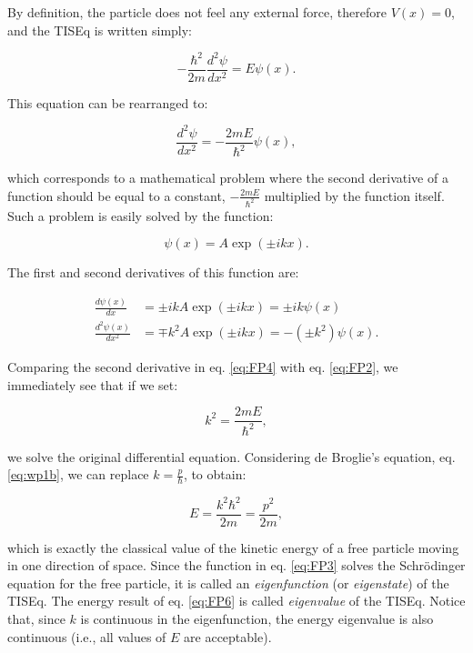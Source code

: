 \documentclass[
  9pt,
]{extbook}
\theoremstyle{definition}
\theoremstyle{definition}
\theoremstyle{definition}
\theoremstyle{remark}
\begin{document}
By definition, the particle does not feel any external force, therefore \(V(x)=0\), and the TISEq is written simply:

\begin{equation}
- \frac{\hbar^2}{2m} \frac{d^2\psi}{dx^2} = E \psi(x).
\label{eq:FP1}
\end{equation}

This equation can be rearranged to:

\begin{equation}
\frac{d^2\psi}{dx^2} =- \frac{2mE}{\hbar^2} \psi(x),
\label{eq:FP2}
\end{equation}

which corresponds to a mathematical problem where the second derivative of a function should be equal to a constant, \(- \frac{2mE}{\hbar^2}\) multiplied by the function itself. Such a problem is easily solved by the function:

\begin{equation}
\psi(x) = A \exp(\pm ikx).
\label{eq:FP3}
\end{equation}

The first and second derivatives of this function are:

\begin{equation}
\begin{aligned}
\frac{d \psi(x)}{dx} &= \pm ik A \exp(\pm ikx) = \pm ik \psi(x) \\
\frac{d^2 \psi(x)}{dx^2} &= \mp k^2  A \exp(\pm ikx) = -(\pm k^2) \psi(x). 
\end{aligned}
\label{eq:FP4}
\end{equation}

Comparing the second derivative in eq. \eqref{eq:FP4} with eq. \eqref{eq:FP2}, we immediately see that if we set:

\begin{equation}
k^2 = \frac{2mE}{\hbar^2},
\label{eq:FP5}
\end{equation}

we solve the original differential equation. Considering de Broglie's equation, eq. \eqref{eq:wp1b}, we can replace \(k=\frac{p}{\hbar}\), to obtain:

\begin{equation}
E = \frac{k^2 \hbar^2}{2m} = \frac{p^2}{2m},
\label{eq:FP6}
\end{equation}

which is exactly the classical value of the kinetic energy of a free particle moving in one direction of space. Since the function in eq. \eqref{eq:FP3} solves the Schrödinger equation for the free particle, it is called an \emph{eigenfunction} (or \emph{eigenstate}) of the TISEq. The energy result of eq. \eqref{eq:FP6} is called \emph{eigenvalue} of the TISEq. Notice that, since \(k\) is continuous in the eigenfunction, the energy eigenvalue is also continuous (i.e., all values of \(E\) are acceptable).
\end{document}
